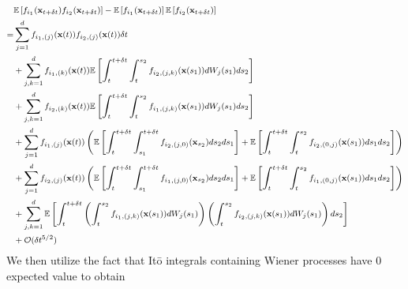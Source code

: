 \begin{equation}
\footnotesize
\begin{aligned}
&\mathbb{E} \left[ f_{i_1}(\mathbf{x}_{t + \delta t}) f_{i_2}(\mathbf{x}_{t + \delta t}) \right]
- \mathbb{E} \left[ f_{i_1}(\mathbf{x}_{t + \delta t}) \right] \mathbb{E} \left[ f_{i_2}(\mathbf{x}_{t + \delta t}) \right] \\
=&
 \sum_{j=1}^d f_{{i_1},(j)}(\mathbf{x}(t)) f_{{i_2},(j)}(\mathbf{x}(t)) \delta t \\
&+ \sum_{j,k=1}^d f_{{i_1},(k)}(\mathbf{x}(t)) \mathbb{E} \left[  \int_t^{t+\delta t} \int_t^{s_2} f_{{i_2},(j,k)}(\mathbf{x}(s_1)) dW_j(s_1) ds_2 \right] \\
&+  \sum_{j, k=1}^d  f_{{i_2},(k)}(\mathbf{x}(t))\mathbb{E} \left[ \int_t^{t+\delta t} \int_t^{s_2} f_{{i_1},(j,k)}(\mathbf{x}(s_1)) dW_j(s_1) ds_2 \right]\\
&+ \sum_{j=1}^d f_{{i_1},(j)}(\mathbf{x}(t)) \left( \mathbb{E} \left[ \int_t^{t+\delta t} \int_{s_1}^{t+\delta t} f_{{i_2},(j,0)}(\mathbf{x}_{s_2}) ds_2 ds_1 \right]
+ \mathbb{E} \left[  \int_t^{t+\delta t} \int_t^{s_2} f_{{i_2},(0,j)}(\mathbf{x}(s_1)) ds_1 ds_2\right] \right) \\
&+  \sum_{j=1}^d f_{{i_2},(j)}(\mathbf{x}(t)) \left( \mathbb{E} \left[ \int_t^{t+\delta t} \int_{s_1}^{t + \delta t} f_{{i_1},(j,0)}(\mathbf{x}_{s_2}) ds_2 ds_1 \right]
+ \mathbb{E} \left[ \int_t^{t+\delta t} \int_t^{s_2} f_{{i_1},(0,j)}(\mathbf{x}(s_1)) ds_1 ds_2 \right] \right) \\
&+ \sum_{j, k=1}^d \mathbb{E} \left[ \int_t^{t+\delta t}\left( \int_t^{s_2} f_{{i_1},(j,k)}(\mathbf{x}(s_1)) dW_j(s_1)  \right) \left(  \int_t^{s_2} f_{{i_2},(j,k)}(\mathbf{x}(s_1)) dW_j(s_1) \right) ds_2 \right] \\
&+ \mathcal{O} (\delta t^{5/2})
\end{aligned}
\end{equation}
%
We then utilize the fact that It\={o} integrals containing Wiener processes have 0 expected value to obtain
